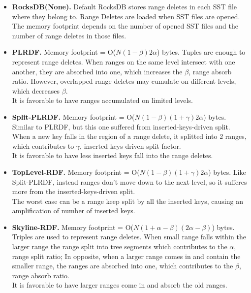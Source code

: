     \begin{itemize}    
        \item \textbf{RocksDB(None).} Default RocksDB stores range deletes in each SST file where they belong to. Range Deletes are loaded when SST files are opened. The memory footprint depends on the number of opened SST files and the number of range deletes in those files. \\
        \item \textbf{PLRDF.} Memory footprint = O($N(1-\beta)2\alpha$) bytes. Tuples are enough to represent range deletes. When ranges on the same level intersect with one another, they are absorbed into one, which increases the $\beta$, range absorb ratio. However, overlapped range deletes may cumulate on different levels, which decreases $\beta$.\\
                                    It is favorable to have ranges accumulated on limited levels.
        \item \textbf{Split-PLRDF.} Memory footprint = O($N(1-\beta)(1+\gamma)2\alpha$) bytes. Similar to PLRDF, but this one suffered from inserted-keys-driven split. When a new key falls in the region of a range delete, it splitted into 2 ranges, which contributes to $\gamma$, inserted-keys-driven split factor. \\
                                    It is favorable to have less inserted keys fall into the range deletes.
        \item \textbf{TopLevel-RDF.} Memory footprint = O($N(1-\beta)(1+\gamma)2\alpha$) bytes. Like Split-PLRDF, instead ranges don't move down to the next level, so it sufferes more from the inserted-keys-driven split. \\
                                    The worst case can be a range keep split by all the inserted keys, causing an amplification of number of inserted keys.
        \item \textbf{Skyline-RDF.} Memory footprint = O($N(1+\alpha-\beta)(2\alpha-\beta)$) bytes. Triples are used to represent range deletes. When small range falls within the larger range the range split into tree segments which contributes to the $\alpha$, range split ratio; In opposite, when a larger range comes in and contain the smaller range, the ranges are absorbed into one, which contributes to the $\beta$, range absorb ratio. \\
                                    It is favorable to have larger ranges come in and absorb the old ranges.
    \end{itemize}



